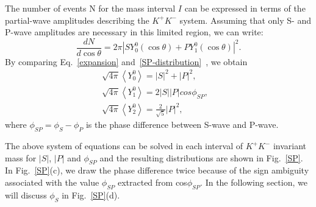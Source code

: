 {    The number of events N for the mass interval $I$ can be expressed in terms of the partial-wave amplitudes describing the $K^{+}K^{-}$ system. Assuming that only S- and P-wave amplitudes are necessary in this limited region, we can write:
    \begin{equation}
        \frac{dN}{d\cos\theta} = 2\pi\left|SY_{0}^{0}(\cos\theta) + PY_{1}^{0}(\cos\theta)\right|^{2}.\label{SP-distribution}
    \end{equation}
    By comparing Eq.~\ref{expansion} and~\ref{SP-distribution}~\cite{PRD56-7299}, we obtain 
    \begin{equation}
        \begin{array}{lr}
            \sqrt{4\pi}\left\langle Y_{0}^{0}\right\rangle = \left|S\right|^{2} + \left|P\right|^{2}, &\\ 
            \sqrt{4\pi}\left\langle Y_{1}^{0}\right\rangle = 2\left|S\right|\left|P\right|cos\phi_{SP}, &\\ 
            \sqrt{4\pi}\left\langle Y_{2}^{0}\right\rangle = \frac{2}{\sqrt{5}}\left|P\right|^{2}, &
        \end{array}\label{SP-RES} 
    \end{equation}
    where $\phi_{SP} = \phi_{S} - \phi_{P}$ is the phase difference between S-wave and P-wave.



    The above system of equations can be solved in each interval of $K^{+}K^{-}$ invariant mass for $\left|S\right|$, $\left|P\right|$ and $\phi_{SP}$ and the resulting distributions are shown in Fig.~\ref{SP}. 
    In Fig.~\ref{SP}(c), we draw the phase difference twice because of the sign ambiguity associated with the value $\phi_{SP}$ extracted from cos$\phi_{SP}$.
    In the following section, we will discuss $\phi_{S}$ in Fig.~\ref{SP}(d).

}


